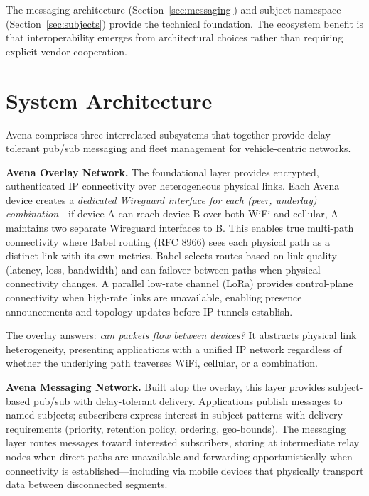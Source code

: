 The messaging architecture (Section~\ref{sec:messaging}) and subject namespace (Section~\ref{sec:subjects}) provide the technical foundation. The ecosystem benefit is that interoperability emerges from architectural choices rather than requiring explicit vendor cooperation.

\section{System Architecture}

Avena comprises three interrelated subsystems that together provide delay-tolerant pub/sub messaging and fleet management for vehicle-centric networks.

\textbf{Avena Overlay Network.} The foundational layer provides encrypted, authenticated IP connectivity over heterogeneous physical links. Each Avena device creates a \emph{dedicated Wireguard interface for each (peer, underlay) combination}---if device A can reach device B over both WiFi and cellular, A maintains two separate Wireguard interfaces to B. This enables true multi-path connectivity where Babel routing (RFC 8966) sees each physical path as a distinct link with its own metrics. Babel selects routes based on link quality (latency, loss, bandwidth) and can failover between paths when physical connectivity changes. A parallel low-rate channel (LoRa) provides control-plane connectivity when high-rate links are unavailable, enabling presence announcements and topology updates before IP tunnels establish.

The overlay answers: \emph{can packets flow between devices?} It abstracts physical link heterogeneity, presenting applications with a unified IP network regardless of whether the underlying path traverses WiFi, cellular, or a combination.

\textbf{Avena Messaging Network.} Built atop the overlay, this layer provides subject-based pub/sub with delay-tolerant delivery. Applications publish messages to named subjects; subscribers express interest in subject patterns with delivery requirements (priority, retention policy, ordering, geo-bounds). The messaging layer routes messages toward interested subscribers, storing at intermediate relay nodes when direct paths are unavailable and forwarding opportunistically when connectivity is established---including via mobile devices that physically transport data between disconnected segments.

